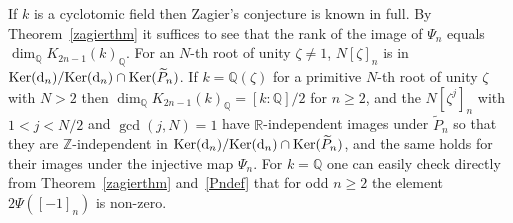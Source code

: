\documentclass{amsart}
\begin{document}
\begin{example}\label{cyclo}
If $ k $ is a cyclotomic field then Zagier's conjecture is known in full.  By Theorem~\ref{zagierthm}
it suffices to see that the rank of the image of $ \Psi_n $ equals $ \dim_{\mathbb Q} {K_{2n-1}(k)_{\mathbb Q}}$.
For an $ N $-th root of unity $ {\zeta}\neq1 $, $ N[\zeta]_n $ is in
$ {\operatorname{Ker}}({{\textup{d}}}_n) / {\operatorname{Ker}}({{\textup{d}}}_n) \cap {\operatorname{Ker}}(\widetilde P_n) $.
If $ k = {\mathbb Q}({\zeta}) $ for a primitive $ N $-th root of unity $ {\zeta} $
with $ N > 2 $ then $ \dim_{\mathbb Q} {K_{2n-1}(k)_{\mathbb Q}}= [k:{\mathbb Q}]/2 $ for $ n \geq 2 $, and 
the $ N [{\zeta}^j]_n $ with $ 1 < j < N/2 $ and $ \gcd(j,N)=1 $
have $ {\mathbb R} $-independent images under $ \widetilde P_n $ \cite[pp.420--422]{Zag91}
so that they are $ {\mathbb Z} $-independent in $ {\operatorname{Ker}}({{\textup{d}}}_n) / {\operatorname{Ker}}({{\textup{d}}}_n) \cap {\operatorname{Ker}}(\widetilde P_n) $,
and the same holds for their images under the injective map $ \Psi_n $.
For $ k={\mathbb Q} $ one can easily check directly from Theorem~\ref{zagierthm} and~\eqref{Pndef}
that for odd $ n \geq 2 $ the element $ 2 \Psi([-1]_n) $ is non-zero.
\end{example}
\end{document}
